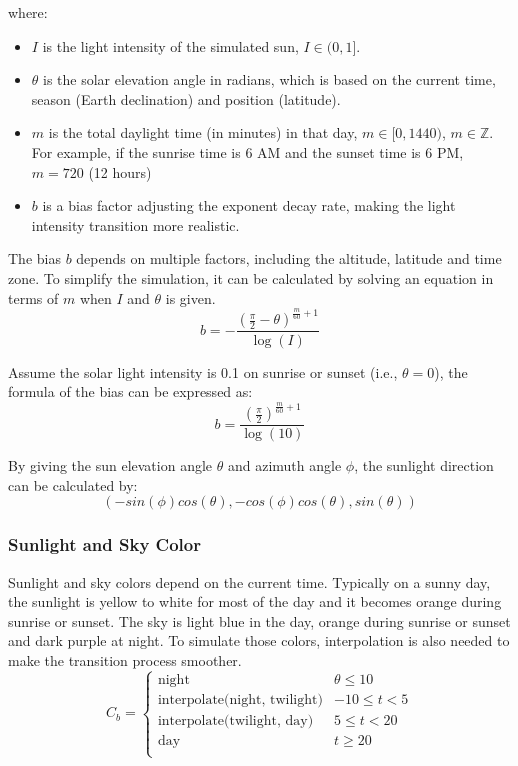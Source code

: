 \documentclass{article}
\begin{document}
where:
\begin{itemize}
  \item \( I \) is the light intensity of the simulated sun, \( I \in (0, 1] \).
  \item \( \theta \) is the solar elevation angle in radians, which is based on the current time, season (Earth declination) and 
  position (latitude).
  \item \( m \) is the total daylight time (in minutes) in that day, \( m \in [0, 1440) \), \( m \in \mathbb{Z} \). For example, if 
  the sunrise time is 6 AM and the sunset time is 6 PM, \( m=720 \) (12 hours)
  \item \( b \) is a bias factor adjusting the exponent decay rate, making the light intensity transition more realistic.
\end{itemize}

The bias \( b \) depends on multiple factors, including the altitude, latitude and time zone. To simplify the simulation, it can be 
calculated by solving an equation in terms of \( m \) when 
\( I \) and \( \theta\) is given.
\[
  b = -\frac{\left(\frac{\pi}{2} - \theta\right)^{\frac{m}{60} + 1}}{\log(I)}
\]

Assume the solar light intensity is 0.1 on sunrise or sunset (i.e., \( \theta=0\)), the formula of the bias can be expressed as:
\[
  b = \frac{\left(\frac{\pi}{2}\right)^{\frac{m}{60} + 1}}{\log(10)}
\]

By giving the sun elevation angle \( \theta \) and azimuth angle \( \phi \), the sunlight direction can be calculated by:
\[
  (-sin(\phi)cos(\theta), -cos(\phi)cos(\theta), sin(\theta))
\]

\subsubsection {Sunlight and Sky Color}
Sunlight and sky colors depend on the current time. Typically on a sunny day, the sunlight is yellow to white for most of the day and 
it becomes orange during sunrise or sunset. The sky is light blue in the day, orange during sunrise or sunset and dark purple at night. 
To simulate those colors, interpolation is also needed to make the transition process smoother. 
\[
  C_{b}=
  \left\{
    \begin{array}{ll}
      \text{night} & \theta \leq 10 \\
      \text{interpolate(night, twilight)} &  -10 \leq t < 5 \\
      \text{interpolate(twilight, day)} &  5 \leq t < 20 \\
      \text{day} & t \geq 20 \\
    \end{array} 
  \right. 
\]
\end{document}
